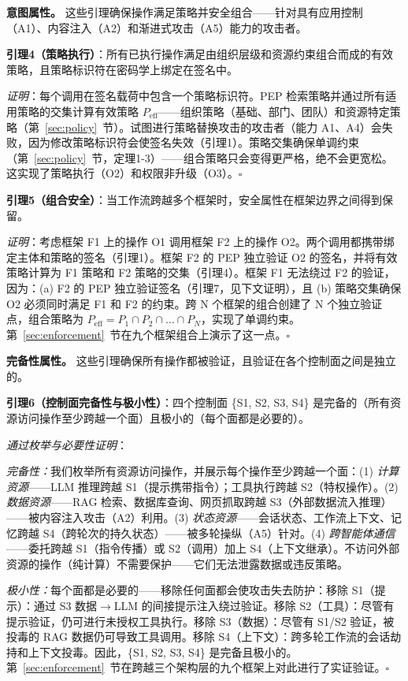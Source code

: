 \noindent\textbf{意图属性。} 这些引理确保操作满足策略并安全组合——针对具有应用控制（A1）、内容注入（A2）和渐进式攻击（A5）能力的攻击者。

\textbf{引理4（策略执行）}：所有已执行操作满足由组织层级和资源约束组合而成的有效策略，且策略标识符在密码学上绑定在签名中。

\textit{证明}：每个调用在签名载荷中包含一个策略标识符。PEP 检索策略并通过所有适用策略的交集计算有效策略 $P_{\text{eff}}$——组织策略（基础、部门、团队）和资源特定策略（第~\ref{sec:policy}~节）。试图进行策略替换攻击的攻击者（能力 A1、A4）会失败，因为修改策略标识符会使签名失效（引理1）。策略交集确保单调约束（第~\ref{sec:policy}~节，定理1-3）——组合策略只会变得更严格，绝不会更宽松。这实现了策略执行（O2）和权限非升级（O3）。$\square$

\textbf{引理5（组合安全）}：当工作流跨越多个框架时，安全属性在框架边界之间得到保留。

\textit{证明}：考虑框架 F1 上的操作 O1 调用框架 F2 上的操作 O2。两个调用都携带绑定主体和策略的签名（引理1）。框架 F2 的 PEP 独立验证 O2 的签名，并将有效策略计算为 F1 策略和 F2 策略的交集（引理4）。框架 F1 无法绕过 F2 的验证，因为：(a) F2 的 PEP 独立验证签名（引理7，见下文证明），且 (b) 策略交集确保 O2 必须同时满足 F1 和 F2 的约束。跨 N 个框架的组合创建了 N 个独立验证点，组合策略为 $P_{\text{eff}} = P_1 \cap P_2 \cap \ldots \cap P_N$，实现了单调约束。第~\ref{sec:enforcement}~节在九个框架组合上演示了这一点。$\square$

\noindent\textbf{完备性属性。} 这些引理确保所有操作都被验证，且验证在各个控制面之间是独立的。

\textbf{引理6（控制面完备性与极小性）}：四个控制面 \{S1, S2, S3, S4\} 是完备的（所有资源访问操作至少跨越一个面）且极小的（每个面都是必要的）。

\textit{通过枚举与必要性证明}：

\textit{完备性：}我们枚举所有资源访问操作，并展示每个操作至少跨越一个面：(1) \textit{计算资源}——LLM 推理跨越 S1（提示携带指令）；工具执行跨越 S2（特权操作）。(2) \textit{数据资源}——RAG 检索、数据库查询、网页抓取跨越 S3（外部数据流入推理）——被内容注入攻击（A2）利用。(3) \textit{状态资源}——会话状态、工作流上下文、记忆跨越 S4（跨轮次的持久状态）——被多轮操纵（A5）针对。(4) \textit{跨智能体通信}——委托跨越 S1（指令传播）或 S2（调用）加上 S4（上下文继承）。不访问外部资源的操作（纯计算）不需要保护——它们无法泄露数据或违反策略。

\textit{极小性：}每个面都是必要的——移除任何面都会使攻击失去防护：移除 S1（提示）：通过 S3 数据$\rightarrow$LLM 的间接提示注入绕过验证。移除 S2（工具）：尽管有提示验证，仍可进行未授权工具执行。移除 S3（数据）：尽管有 S1/S2 验证，被投毒的 RAG 数据仍可导致工具调用。移除 S4（上下文）：跨多轮工作流的会话劫持和上下文投毒。因此，\{S1, S2, S3, S4\} 是完备且极小的。第~\ref{sec:enforcement}~节在跨越三个架构层的九个框架上对此进行了实证验证。$\square$

